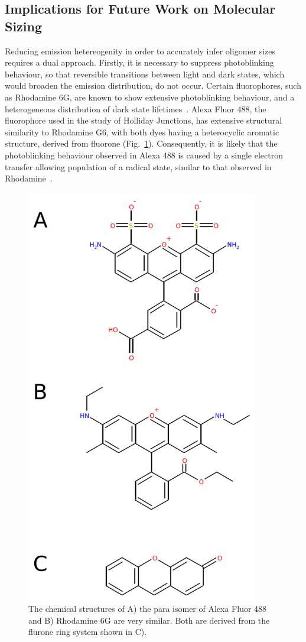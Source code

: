 \subsection{Implications for Future Work on Molecular Sizing}
Reducing emission hetereogenity in order to accurately infer oligomer sizes requires a dual approach. Firstly, it is necessary to suppress photoblinking behaviour, so that reversible transitions between light and dark states, which would broaden the emission distribution, do not occur. Certain fluorophores, such as Rhodamine 6G, are known to show extensive photoblinking behaviour, and a heterogeneous distribution of dark state lifetimes~\cite{zondervan03}. Alexa Fluor 488, the fluorophore used in the study of Holliday Junctions, has extensive structural similarity to Rhodamine G6, with both dyes having a heterocyclic aromatic structure, derived from fluorone (Fig.~\ref{fig:fluorone}). Consequently, it is likely that the photoblinking behaviour observed in Alexa 488 is caused by a single electron transfer allowing population of a radical state, similar to that observed in Rhodamine~\cite{zondervan03}. 


\begin{figure}
   \begin{center}
      \includegraphics*[width=4in]{sizing/fluorone.pdf}
      \caption{The chemical structures of A) the para isomer of Alexa Fluor 488 and B) Rhodamine 6G are very similar. Both are derived from the flurone ring system shown in C).}
      \label{fig:fluorone}
   \end{center}
\end{figure}

